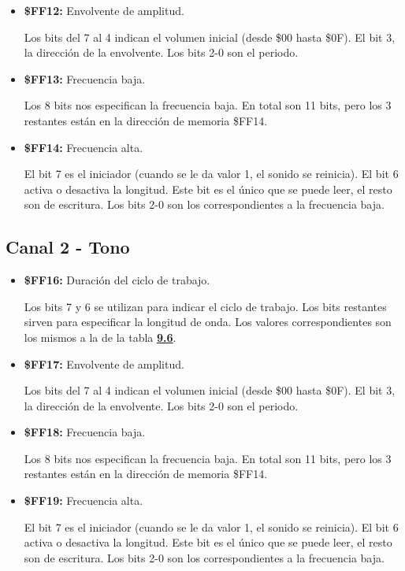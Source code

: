 \begin{itemize}
		\item \textbf{\$FF12:} Envolvente de amplitud.
		
		Los bits del 7 al 4 indican el volumen inicial (desde \$00 hasta \$0F). El bit 3, la dirección de la envolvente. Los bits 2-0 son el periodo.	
		
		\item \textbf{\$FF13:} Frecuencia baja.

		Los 8 bits nos especifican la frecuencia baja. En total son 11 bits, pero los 3 restantes están en la dirección de memoria \$FF14.		
		
		\item \textbf{\$FF14:} Frecuencia alta.
		
		El bit 7 es el iniciador (cuando se le da valor 1, el sonido se reinicia). El bit 6 activa o desactiva la longitud. Este bit es el único que se puede leer, el resto son de escritura. Los bits 2-0 son los correspondientes a la frecuencia baja.		
		
	\end{itemize}

\subsection{Canal 2 - Tono}
	
	\begin{itemize}
		\item \textbf{\$FF16:} Duración del ciclo de trabajo.
		
		Los bits 7 y 6 se utilizan para indicar el ciclo de trabajo. Los bits restantes sirven para especificar la longitud de onda. Los valores correspondientes son los mismos a la de la tabla \textbf{\hyperref[table:cycle]{9.6}}.
		
		\item \textbf{\$FF17:} Envolvente de amplitud.
	
		Los bits del 7 al 4 indican el volumen inicial (desde \$00 hasta \$0F). El bit 3, la dirección de la envolvente. Los bits 2-0 son el periodo.			
		
		\item \textbf{\$FF18:} Frecuencia baja.
		
		Los 8 bits nos especifican la frecuencia baja. En total son 11 bits, pero los 3 restantes están en la dirección de memoria \$FF14.		
		
		\item \textbf{\$FF19:} Frecuencia alta.
		
		El bit 7 es el iniciador (cuando se le da valor 1, el sonido se reinicia). El bit 6 activa o desactiva la longitud. Este bit es el único que se puede leer, el resto son de escritura. Los bits 2-0 son los correspondientes a la frecuencia baja.		
		
	\end{itemize}
	
